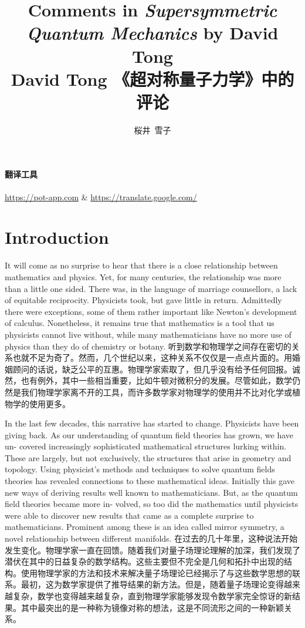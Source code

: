 \documentclass{article}
\title{Comments in \textit{Supersymmetric Quantum Mechanics} by David Tong \\ David Tong 《超对称量子力学》中的评论}
\author{桜井\ 雪子}
\date{}
\begin{document}
\maketitle
\tableofcontents

\paragraph{翻译工具}\url{https://pot-app.com} \& \url{https://translate.google.com/}

\setcounter{section}{-1}
\section{Introduction}

\begin{paracol}{2}
It will come as no surprise to hear that there is a close relationship between mathematics and physics. Yet, for many centuries, the relationship was more than a little one sided. There was, in the language of marriage counsellors, a lack of equitable reciprocity. Physicists took, but gave little in return. Admittedly there were exceptions, some of them rather important like Newton's development of calculus. Nonetheless, it remains true that mathematics is a tool that us physicists cannot live without, while many mathematicians have no more use of physics than they do of chemistry or botany.
\switchcolumn
听到数学和物理学之间存在密切的关系也就不足为奇了。然而，几个世纪以来，这种关系不仅仅是一点点片面的。用婚姻顾问的话说，缺乏公平的互惠。物理学家索取了，但几乎没有给予任何回报。诚然，也有例外，其中一些相当重要，比如牛顿对微积分的发展。尽管如此，数学仍然是我们物理学家离不开的工具，而许多数学家对物理学的使用并不比对化学或植物学的使用更多。
\switchcolumn*

In the last few decades, this narrative has started to change. Physicists have been giving back. As our understanding of quantum field theories has grown, we have un- covered increasingly sophisticated mathematical structures lurking within. These are largely, but not exclusively, the structures that arise in geometry and topology. Using physicist's methods and techniques to solve quantum fields theories has revealed connections to these mathematical ideas. Initially this gave new ways of deriving results well known to mathematicians. But, as the quantum field theories became more in- volved, so too did the mathematics until physicists were able to discover new results that came as a complete surprise to mathematicians. Prominent among these is an idea called mirror symmetry, a novel relationship between different manifolds.
\switchcolumn
在过去的几十年里，这种说法开始发生变化。物理学家一直在回馈。随着我们对量子场理论理解的加深，我们发现了潜伏在其中的日益复杂的数学结构。这些主要但不完全是几何和拓扑中出现的结构。使用物理学家的方法和技术来解决量子场理论已经揭示了与这些数学思想的联系。最初，这为数学家提供了推导结果的新方法。但是，随着量子场理论变得越来越复杂，数学也变得越来越复杂，直到物理学家能够发现令数学家完全惊讶的新结果。其中最突出的是一种称为镜像对称的想法，这是不同流形之间的一种新颖关系。
\switchcolumn*


\end{paracol}
\end{document}
